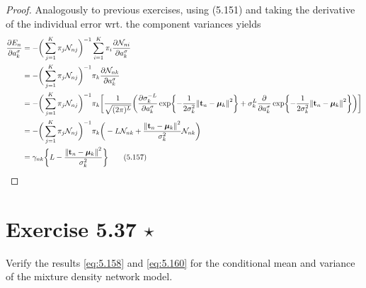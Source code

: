 \begin{proof}
    Analogously to previous exercises, using (5.151) and 
    taking the derivative of the individual error wrt. the component
    variances yields
    \begin{align*}
        \pdv{E_n}{a_k^\sigma}
        &= -\bigg(\sum_{j=1}^{K} \pi_j \mathcal{N}_{nj}\bigg)^{-1}
            \sum_{i=1}^{K} \pi_i \pdv{\mathcal{N}_{ni}}{a_{k}^\sigma} \\
        &= -\bigg(\sum_{j=1}^{K} \pi_j \mathcal{N}_{nj}\bigg)^{-1}
            \pi_k \pdv{\mathcal{N}_{nk}}{a_{k}^\sigma} \\
        &= -\bigg(\sum_{j=1}^{K} \pi_j \mathcal{N}_{nj}\bigg)^{-1}
            \pi_k\bigg[\frac{1}{\sqrt{(2\pi)^L}} \bigg(\pdv{\sigma_k^{-L}}{a_k^\sigma}
            \exp{-\frac{1}{2\sigma_k^2} \norm{\mathbf{t}_n - \bm{\mu}_k}^2} +
            \sigma_k^{L} \pdv{a_k^\sigma} 
            \exp{-\frac{1}{2\sigma_k^2} \norm{\mathbf{t}_n - \bm{\mu}_k}^2}\bigg)\bigg] \\
        &= -\bigg(\sum_{j=1}^{K} \pi_j \mathcal{N}_{nj}\bigg)^{-1}
            \pi_k\bigg(-L \mathcal{N}_{nk} 
            + \frac{\norm{\mathbf{t}_n - \bm{\mu}_k}^2}{\sigma_k^2} \mathcal{N}_{nk}\bigg) \\
        &= \gamma_{nk}\bigg\{L-
        \frac{\norm{\mathbf{t}_n - \bm{\mu}_k}^2}{\sigma_k^2}\bigg\}
        \label{eq:5.157}\tag{5.157}
    \end{align*}
\end{proof}

\section*{Exercise 5.37 $\star$}
Verify the results \eqref{eq:5.158} and \eqref{eq:5.160} for the conditional mean and 
variance of the mixture density network model.

\vspace{1em}

